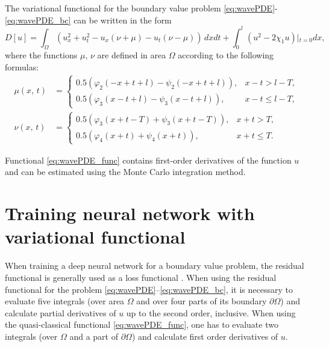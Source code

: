 \documentclass[12pt]{llncs}
\begin{document}
\begin{theorem}
The variational functional for the boundary value problem \eqref{eq:wavePDE}-\eqref{eq:wavePDE_bc}  can be written in the form
\begin{equation}
D\left[u\right]=\int_{\Omega}\left(u_{x}^{2}+u_{t}^{2}-u_{x}\left(\nu+\mu\right)-u_{t}\left(\nu-\mu\right)\right)\,dxdt+\int_{0}^{l}\left(u^{2}-2\chi_{1}u\right)\left|_{t=0}\right. dx,
\label{eq:wavePDE_func}
\end{equation}
where the functions $\mu,\,\nu$ are defined in area $\Omega$ according to the following formulas:
\begin{equation}
\begin{array}{ll}
\mu\left(x,\,t\right) & =\left\{\begin{array}{ll}
0.5\left(\varphi_{2}\left(-x+t+l\right)-\psi_{2}\left(-x+t+l\right)\right), & x-t>l-T,\\
0.5\left(\varphi_{3}\left(x-t+l\right)-\psi_{3}\left(x-t+l\right)\right), & x-t\leq l-T,
\end{array}\right. \\[1em]
\nu\left(x,\,t\right) & =\left\{\begin{array}{ll}
0.5\left(\varphi_{3}\left(x+t-T\right)+\psi_{3}\left(x+t-T\right)\right), & x+t>T,\\
0.5\left(\varphi_{4}\left(x+t\right)+\psi_{4}\left(x+t\right)\right), & x+t\leq T.
\end{array}\right.
\end{array}
\end{equation}
\end{theorem}

Functional \eqref{eq:wavePDE_func} contains first-order derivatives of the function $u$ and can be estimated using the Monte Carlo integration method.

\section{Training neural network with variational functional}

When training a deep neural network for a boundary value problem, the residual functional is generally used as a loss functional \cite{Raissi2019}. 
When using the residual functional for the problem  \eqref{eq:wavePDE}--\eqref{eq:wavePDE_bc},
it is necessary to evaluate five integrals (over area $\Omega$ and over four parts of its boundary $\partial\Omega$)  and calculate partial derivatives of $u$ up to the second order, inclusive.
When using the quasi-classical functional \eqref{eq:wavePDE_func},  one has to evaluate two integrals (over $\Omega$ and a part of $\partial\Omega$) and calculate first order derivatives of $u$.
\end{document}
